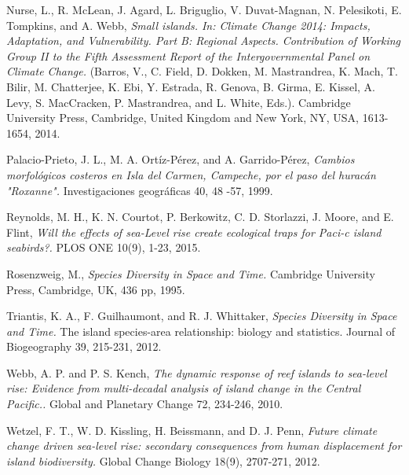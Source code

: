 \documentclass{article} %
\begin{document}
\begin{thebibliography}{10}
\hypertarget{nurse}{}	 
Nurse, L., R. McLean, J. Agard, L. Briguglio, V. Duvat-Magnan, N. Pelesikoti, E.
Tompkins, and A. Webb,
\textit{Small islands. In: Climate Change 2014:
Impacts, Adaptation, and Vulnerability. Part B: Regional Aspects. Contribution
of Working Group II to the Fifth Assessment Report of the Intergovernmental
Panel on Climate Change.} 
(Barros, V., C. Field, D. Dokken, M. Mastrandrea, K.
Mach, T. Bilir, M. Chatterjee, K. Ebi, Y. Estrada, R. Genova, B. Girma, E. Kissel,
A. Levy, S. MacCracken, P. Mastrandrea, and L. White, Eds.). Cambridge
University Press, Cambridge, United Kingdom and New York, NY, USA, 1613-
1654, 2014.

\hypertarget{palacio}{}	 
Palacio-Prieto, J. L., M. A. Ortíz-Pérez, and A. Garrido-Pérez,
\textit{Cambios morfológicos costeros en Isla del Carmen, Campeche, por el paso del huracán "Roxanne".} 
Investigaciones geográficas 40, 48 -57, 1999.

\hypertarget{reynolds}{}	 
Reynolds, M. H., K. N. Courtot, P. Berkowitz, C. D. Storlazzi, J. Moore, and E. Flint,
\textit{Will the effects of sea-Level rise create ecological traps for Paci-c island
seabirds?.} 
PLOS ONE 10(9), 1-23, 2015.

\hypertarget{rosenzweig}{}	 
Rosenzweig, M.,
\textit{Species Diversity in Space and Time.} 
Cambridge University Press, Cambridge, UK, 436 pp, 1995.

\hypertarget{triantis}{}	 
Triantis, K. A., F. Guilhaumont, and R. J. Whittaker,
\textit{Species Diversity in Space and Time.} 
The island species-area relationship: biology and statistics. Journal of Biogeography 39, 215-231, 2012.

\hypertarget{webb}{}	 
Webb, A. P. and P. S. Kench,
\textit{The dynamic response of reef islands to sea-level
rise: Evidence from multi-decadal analysis of island change in the Central
Pacific..} 
Global and Planetary Change 72, 234-246, 2010.

\hypertarget{wetzel}{}	 
Wetzel, F. T., W. D. Kissling, H. Beissmann, and D. J. Penn,
\textit{Future climate
change driven sea-level rise: secondary consequences from human
displacement for island biodiversity.} 
Global Change Biology 18(9), 2707-271, 2012.








\end{thebibliography}
\end{document}
